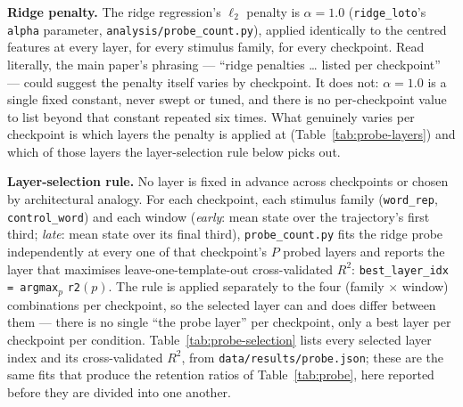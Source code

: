 \documentclass[11pt]{article}
\begin{document}
\noindent\textbf{Ridge penalty.} The ridge regression's $\ell_2$ penalty is
$\alpha=1.0$ (\texttt{ridge\_loto}'s \texttt{alpha} parameter,
\texttt{analysis/probe\_count.py}), applied identically to the centred
features at every layer, for every stimulus family, for every checkpoint.
Read literally, the main paper's phrasing --- ``ridge penalties \dots{} listed
per checkpoint'' --- could suggest the penalty itself varies by checkpoint. It
does not: $\alpha=1.0$ is a single fixed constant, never swept or tuned, and
there is no per-checkpoint value to list beyond that constant repeated six
times. What genuinely varies per checkpoint is which layers the penalty is
applied at (Table~\ref{tab:probe-layers}) and which of those layers the
layer-selection rule below picks out.

\noindent\textbf{Layer-selection rule.} No layer is fixed in advance across
checkpoints or chosen by architectural analogy. For each checkpoint, each
stimulus family (\texttt{word\_rep}, \texttt{control\_word}) and each window
(\emph{early}: mean state over the trajectory's first third; \emph{late}: mean
state over its final third), \texttt{probe\_count.py} fits the ridge probe
independently at every one of that checkpoint's $P$ probed layers and reports
the layer that maximises leave-one-template-out cross-validated $R^2$:
\texttt{best\_layer\_idx = argmax}$_p$ \texttt{r2}$(p)$. The rule is applied
separately to the four (family $\times$ window) combinations per checkpoint,
so the selected layer can and does differ between them --- there is no single
``the probe layer'' per checkpoint, only a best layer per checkpoint per
condition. Table~\ref{tab:probe-selection} lists every selected layer index
and its cross-validated $R^2$, from \texttt{data/results/probe.json}; these
are the same fits that produce the retention ratios of
Table~\ref{tab:probe}, here reported before they are divided into one
another.
\end{document}
